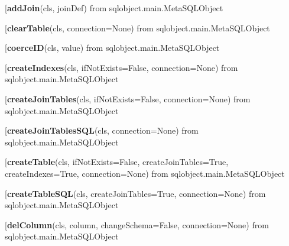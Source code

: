 \begin{description}\item[{\bf addJoin}(cls, joinDef) from sqlobject.main.MetaSQLObject\end{description}

\begin{description}\item[{\bf clearTable}(cls, connection=None) from sqlobject.main.MetaSQLObject\end{description}

\begin{description}\item[{\bf coerceID}(cls, value) from sqlobject.main.MetaSQLObject\end{description}

\begin{description}\item[{\bf createIndexes}(cls, ifNotExists=False, connection=None) from sqlobject.main.MetaSQLObject\end{description}

\begin{description}\item[{\bf createJoinTables}(cls, ifNotExists=False, connection=None) from sqlobject.main.MetaSQLObject\end{description}

\begin{description}\item[{\bf createJoinTablesSQL}(cls, connection=None) from sqlobject.main.MetaSQLObject\end{description}

\begin{description}\item[{\bf createTable}(cls, ifNotExists=False, createJoinTables=True, createIndexes=True, connection=None) from sqlobject.main.MetaSQLObject\end{description}

\begin{description}\item[{\bf createTableSQL}(cls, createJoinTables=True, connection=None) from sqlobject.main.MetaSQLObject\end{description}

\begin{description}\item[{\bf delColumn}(cls, column, changeSchema=False, connection=None) from sqlobject.main.MetaSQLObject\end{description}

